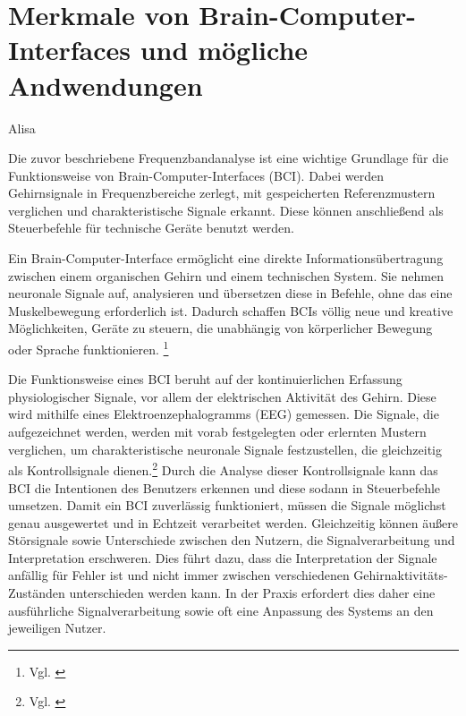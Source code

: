 \section{Merkmale von Brain-Computer-Interfaces und mögliche Andwendungen}
Alisa \newline

Die zuvor beschriebene Frequenzbandanalyse ist eine wichtige Grundlage für die Funktionsweise von Brain-Computer-Interfaces (BCI).
Dabei werden Gehirnsignale in Frequenzbereiche zerlegt, mit gespeicherten Referenzmustern verglichen und charakteristische Signale erkannt. 
Diese können anschließend als Steuerbefehle für technische Geräte benutzt werden.


Ein Brain-Computer-Interface ermöglicht eine direkte Informationsübertragung zwischen einem organischen Gehirn und einem technischen System.
Sie nehmen neuronale Signale auf, analysieren und übersetzen diese in Befehle, ohne das eine Muskelbewegung erforderlich ist. 
Dadurch schaffen BCIs völlig neue und kreative Möglichkeiten, Geräte zu steuern, die unabhängig von körperlicher Bewegung oder Sprache funktionieren. \footnote{Vgl. \cite{heuer2015}}


Die Funktionsweise eines BCI beruht auf der kontinuierlichen Erfassung physiologischer Signale, vor allem der elektrischen Aktivität des Gehirn.
Diese wird mithilfe eines Elektroenzephalogramms (EEG) gemessen.
Die Signale, die aufgezeichnet werden, werden mit vorab festgelegten oder erlernten Mustern verglichen, um charakteristische neuronale Signale festzustellen, die gleichzeitig als Kontrollsignale dienen.\footnote{Vgl. \cite{heuer2015}}
Durch die Analyse dieser Kontrollsignale kann das BCI die Intentionen des Benutzers erkennen und diese sodann in Steuerbefehle umsetzen.
Damit ein BCI zuverlässig funktioniert, müssen die Signale möglichst genau ausgewertet und in Echtzeit verarbeitet werden.
Gleichzeitig können äußere Störsignale sowie Unterschiede zwischen den Nutzern, die Signalverarbeitung und Interpretation erschweren.
Dies führt dazu, dass die Interpretation der Signale anfällig für Fehler ist und nicht immer zwischen verschiedenen Gehirnaktivitäts- Zuständen unterschieden werden kann.
In der Praxis erfordert dies daher eine ausführliche Signalverarbeitung sowie oft eine Anpassung des Systems an den jeweiligen Nutzer.


